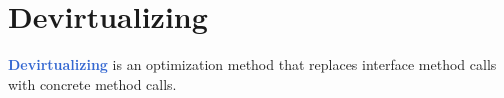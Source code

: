 \section{Devirtualizing}

\begin{frame}[t]
	\frametitlesec
	\pause
	\textbf{\textcolor{highlight}{Devirtualizing}} is an optimization method that replaces interface method calls with concrete method calls.
\end{frame}
